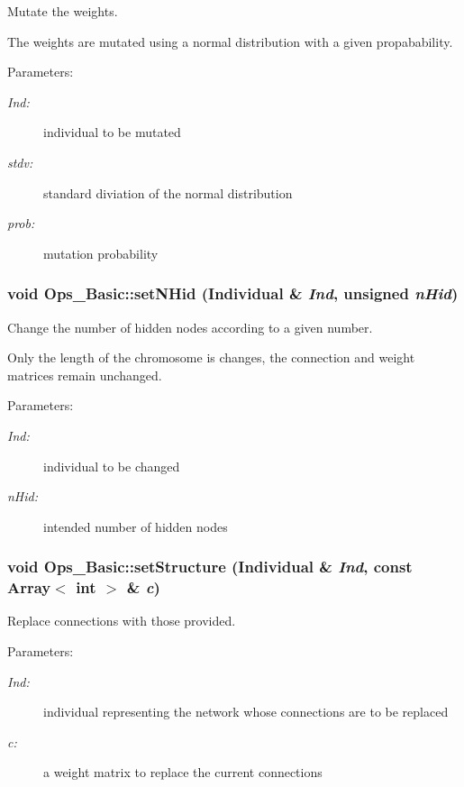 Mutate the weights.

The weights are mutated using a normal distribution  with a given propabability. \begin{Desc}
\item[Parameters: ]\par
\begin{description}
\item[{\em 
Ind:}]individual to be mutated \item[{\em 
stdv:}]standard diviation of the normal distribution \item[{\em 
prob:}]mutation probability \end{description}
\end{Desc}
\subsubsection{\setlength{\rightskip}{0pt plus 5cm}void Ops\_\-Basic::set\-NHid (Individual \& {\em Ind}, unsigned {\em n\-Hid})\hspace{0.3cm}{\tt  [protected]}}\label{classOps__Basic_b1}


Change the number of hidden nodes according to a given number.

Only the length of the chromosome is changes, the connection and weight matrices remain unchanged. \begin{Desc}
\item[Parameters: ]\par
\begin{description}
\item[{\em 
Ind:}]individual to be changed \item[{\em 
n\-Hid:}]intended number of hidden nodes \end{description}
\end{Desc}
\subsubsection{\setlength{\rightskip}{0pt plus 5cm}void Ops\_\-Basic::set\-Structure (Individual \& {\em Ind}, const Array$<$ int $>$ \& {\em c})}\label{classOps__Basic_a15}


Replace connections with those provided.

\begin{Desc}
\item[Parameters: ]\par
\begin{description}
\item[{\em 
Ind:}]individual representing the network whose connections  are to be replaced \item[{\em 
c:}]a weight matrix to replace the current connections \end{description}
\end{Desc}
